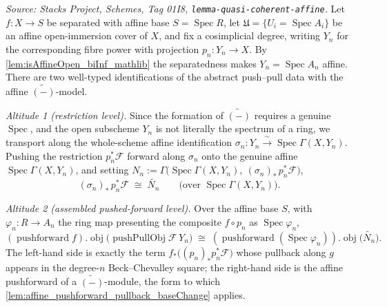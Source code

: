 \begin{lemma}
  \label{lem:pushPullObj_iso_tilde}
  \textit{Source: Stacks Project, Schemes, Tag 01I8, \texttt{lemma-quasi-coherent-affine}.}
  Let \(f : X \to S\) be separated with affine base \(S = \operatorname{Spec} R\), let
  \(\mathfrak{U} = \{U_i = \operatorname{Spec} A_i\}\) be an affine open-immersion cover of
  \(X\), and fix a cosimplicial degree, writing \(Y_n\) for the corresponding fibre power
  with projection \(p_n : Y_n \to X\). By \cref{lem:isAffineOpen_biInf_mathlib} the
  separatedness makes \(Y_n = \operatorname{Spec} A_n\) affine. There are two well-typed
  identifications of the abstract push--pull data with the affine \(\widetilde{(-)}\)-model.

  \emph{Altitude 1 (restriction level).} Since the formation of \(\widetilde{(-)}\) requires a
  genuine \(\operatorname{Spec}\), and the open subscheme \(Y_n\) is not literally the spectrum
  of a ring, we transport along the whole-scheme affine identification
  \(\sigma_n : Y_n \xrightarrow{\ \sim\ } \operatorname{Spec}\Gamma(X, Y_n)\). Pushing the
  restriction \(p_n^*\mathcal{F}\) forward along \(\sigma_n\) onto the genuine affine
  \(\operatorname{Spec}\Gamma(X, Y_n)\), and setting
  \(N_n := \Gamma\bigl(\operatorname{Spec}\Gamma(X, Y_n),\ (\sigma_n)_*\,p_n^*\mathcal{F}\bigr)\),
  \[
    (\sigma_n)_*\,p_n^*\mathcal{F} \;\cong\; \widetilde{N_n}
    \qquad\text{(over } \operatorname{Spec}\Gamma(X, Y_n)\text{).}
  \]

  \emph{Altitude 2 (assembled pushed-forward level).} Over the affine base \(S\), with
  \(\varphi_n : R \to A_n\) the ring map presenting the composite \(f \circ p_n\) as
  \(\operatorname{Spec}\varphi_n\),
  \[
    (\operatorname{pushforward} f).\!\operatorname{obj}\bigl(\operatorname{pushPullObj}
      \mathcal{F}\, Y_n\bigr)
    \;\cong\;
    (\operatorname{pushforward}(\operatorname{Spec}\varphi_n)).\!\operatorname{obj}\bigl(
      \widetilde{N_n}\bigr).
  \]
  The left-hand side is exactly the term \(f_*\bigl((p_n)_* p_n^*\mathcal{F}\bigr)\) whose
  pullback along \(g\) appears in the degree-\(n\) Beck--Chevalley square; the right-hand
  side is the affine pushforward of a \(\widetilde{(-)}\)-module, the form to which
  \cref{lem:affine_pushforward_pullback_baseChange} applies.
\end{lemma}
